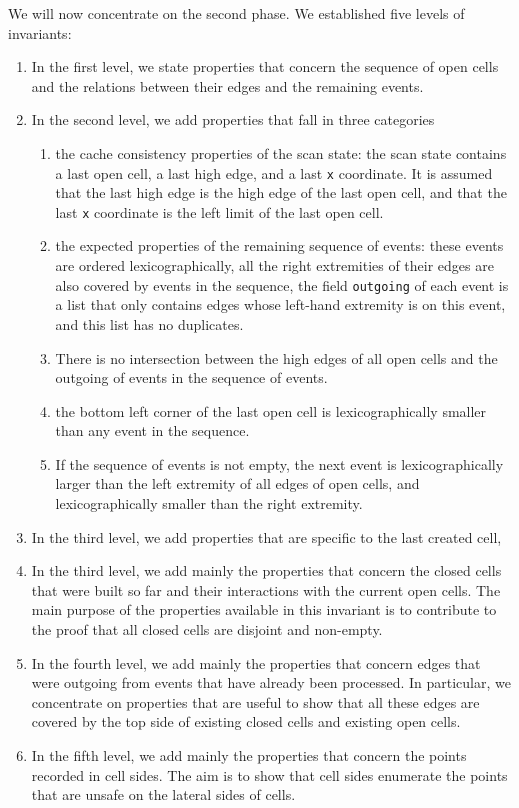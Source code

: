 \documentclass[a4paper, USenglish, cleveref, autoref, thm-restate]{lipics-v2021}
\begin{document}
We will now concentrate on the second phase.
We established five levels of invariants:
\begin{enumerate}
\item In the first level, we state properties that concern the
sequence of open cells and the relations between their edges and the remaining
events.
\item In the second level, we add properties that fall in three categories
  \begin{enumerate}
    \item the cache consistency properties of
  the scan state: the scan state contains a last open cell, a last high edge,
  and a last {\tt x} coordinate.  It is assumed that the last high edge
  is the high edge of the last open cell, and that the last {\tt x} coordinate
  is the left limit of the last open cell.
\item the expected properties of the remaining sequence of events: these
  events are ordered lexicographically, all the right extremities of their
  edges are also covered by events in the sequence, the field {\tt outgoing}
  of each event is a list that only contains edges whose left-hand extremity
  is on this event, and this list has no duplicates.
\item There is no intersection between the high edges of all open cells
  and the outgoing of events in the sequence of events.
\item the bottom left corner of the last open cell is lexicographically
  smaller than any event in the sequence.
\item If the sequence of events is not empty, the next event is
  lexicographically larger than the left extremity of all edges of
  open cells, and lexicographically smaller than the right extremity.
\end{enumerate}
\item In the third level, we add properties that are specific to the
  last created cell,
\item In the third level, we add mainly the properties that concern
  the closed cells that were built so far and their interactions with
  the current open cells.  The main purpose of the properties
  available in this invariant is to contribute to the proof that
  all closed cells are disjoint and non-empty.
\item In the fourth level, we add mainly the properties that concern
  edges that were outgoing from events that have already been processed.
  In particular, we concentrate on properties that are useful to show that
  all these edges are covered by the top side of existing closed cells and
  existing open cells.
\item In the fifth level, we add mainly the properties that concern
  the points recorded in cell sides.  The aim is to show that cell
  sides enumerate the points that are unsafe on the lateral
  sides of cells.
\end{enumerate}
\end{document}
